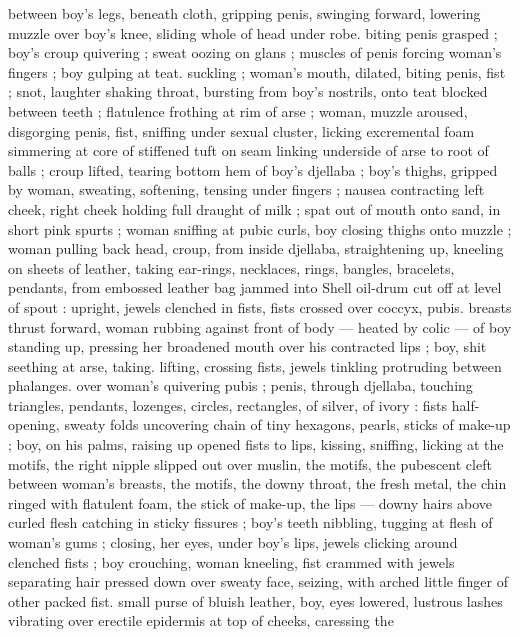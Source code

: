 {between boy's legs, beneath cloth, gripping penis, swinging forward, 
lowering muzzle over boy's knee, sliding whole of head under robe. 
biting penis grasped ; boy's croup quivering ; sweat oozing on glans 
; muscles of penis forcing woman's fingers ; boy gulping at teat. 
suckling ; woman's mouth, dilated, biting penis, fist ; snot, laughter 
shaking throat, bursting from boy's nostrils, onto teat blocked 
between teeth ; flatulence frothing at rim of arse ; woman, muzzle 
aroused, disgorging penis, fist, sniffing under sexual cluster, licking 
excremental foam simmering at core of stiffened tuft on seam linking 
underside of arse to root of balls ; croup lifted, tearing bottom hem 
of boy's djellaba ; boy's thighs, gripped by woman, sweating, 
softening, tensing under fingers ; nausea contracting left cheek, right 
cheek holding full draught of milk ; spat out of mouth onto sand, in 
short pink spurts ; woman sniffing at pubic curls, boy closing thighs 
onto muzzle ; woman pulling back head, croup, from inside djellaba, 
straightening up, kneeling on sheets of leather, taking ear-rings, 
necklaces, rings, bangles, bracelets, pendants, from embossed 
leather bag jammed into Shell oil-drum cut off at level of spout : 
upright, jewels clenched in fists, fists crossed over coccyx, pubis. 
breasts thrust forward, woman rubbing against front of body --- 
heated by colic --- of boy standing up, pressing her broadened 
mouth over his contracted lips ; boy, shit seething at arse, taking. 
lifting, crossing fists, jewels tinkling protruding between phalanges. 
over woman's quivering pubis ; penis, through djellaba, touching 
triangles, pendants, lozenges, circles, rectangles, of silver, of ivory : 
fists half-opening, sweaty folds uncovering chain of tiny hexagons, 
pearls, sticks of make-up ; boy, on his palms, raising up opened fists 
to lips, kissing, sniffing, licking at the motifs, the right nipple slipped 
out over muslin, the motifs, the pubescent cleft between woman's 
breasts, the motifs, the downy throat, the fresh metal, the chin ringed 
with flatulent foam, the stick of make-up, the lips --- downy hairs 
above curled flesh catching in sticky fissures ; boy's teeth nibbling, 
tugging at flesh of woman's gums ; closing, her eyes, under boy's 
lips, jewels clicking around clenched fists ; boy crouching, woman 
kneeling, fist crammed with jewels separating hair pressed down over 
sweaty face, seizing, with arched little finger of other packed fist. 
small purse of bluish leather, boy, eyes lowered, lustrous lashes 
vibrating over erectile epidermis at top of cheeks, caressing the 
}
